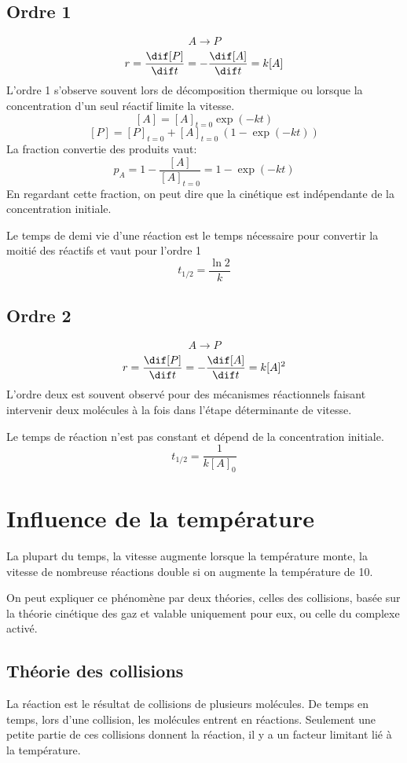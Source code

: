 \subsection{Ordre 1}
\[ A\longrightarrow P \]
\[ r = \frac{\dif [P]}{\dif t} = -\frac{\dif [A]}{\dif t} = k[A] \]
L'ordre 1 s'observe souvent lors de décomposition thermique ou
lorsque la concentration d'un seul réactif limite la vitesse.
\[ [A] = [A]_{t = 0} \exp(-kt) \]
\[ [P] = [P]_{t = 0}+[A]_{t = 0}\ (1-\exp (-kt)) \]
La fraction convertie des produits vaut:
\[ p_A = 1-\frac{[A]}{[A]_{t = 0}} = 1-\exp (-kt) \]
En regardant cette fraction, on peut dire que la cinétique est
indépendante de la concentration initiale.

Le temps de demi vie d'une réaction est le temps nécessaire
pour convertir la moitié des réactifs et vaut pour l'ordre 1
\[ t_{1/2} = \frac {\ln 2}{k} \]

\subsection{Ordre 2}
\[ A\longrightarrow P \]
\[ r = \frac{\dif [P]}{\dif t} = -\frac{\dif [A]}{\dif t} = k[A]^2 \]
L'ordre deux est souvent observé pour des mécanismes réactionnels faisant
intervenir deux molécules à la fois dans l'étape déterminante de vitesse.

Le temps de réaction n'est pas constant et dépend de la concentration initiale.
\[ t_{1/2} = \frac 1{k[A]_0} \]

\section{Influence de la température}
La plupart du temps, la vitesse augmente lorsque la température monte,
la vitesse de nombreuse réactions double si on augmente
la température de \si{10}{\celsius}.

On peut expliquer ce phénomène par deux théories,
celles des collisions, basée sur la théorie cinétique des gaz et
valable uniquement pour eux, ou celle du complexe activé.

\subsection{Théorie des collisions}
La réaction est le résultat de collisions de plusieurs molécules.
De temps en temps, lors d'une collision, les molécules entrent en réactions.
Seulement une petite partie de ces collisions donnent la réaction,
il y a un facteur limitant lié à la température.

